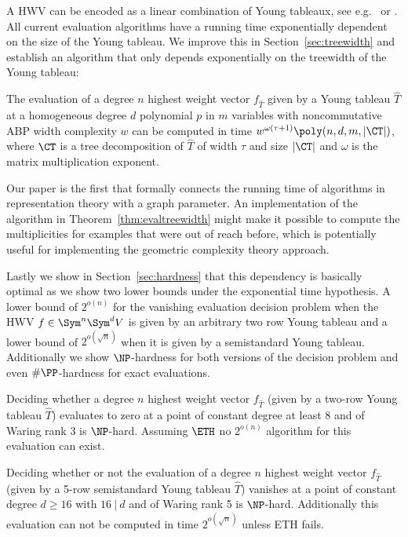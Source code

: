 A HWV can be encoded as a linear combination of Young tableaux, see e.g.~\cite[\S3.9]{Ott:13} or \cite[Sec.~4.3]{ike:12b}.
All current evaluation algorithms have a running time exponentially dependent on the size of the Young tableau.
We improve this in Section~\ref{sec:treewidth} and establish an algorithm that only depends exponentially on the treewidth of the Young tableau:
\begin{theorem*thm:evaltreewidth}
The evaluation of a degree $n$ highest weight vector $f_{\hat T}$ given by a Young tableau $\hat{T}$ 
at a homogeneous degree $d$ polynomial $p$ in $m$ variables with noncommutative ABP width complexity $w$ can be computed in time $w^{\omega(\tau+1)}\poly(n,d,m,|\CT|)$,
where $\CT$ is a tree decomposition of $\hat T$ of width $\tau$ and size $|\CT|$ and $\omega$ is the matrix multiplication exponent.
\end{theorem*thm:evaltreewidth}

Our paper is the first that formally connects the running time of algorithms in representation theory with a graph parameter. An implementation of the algorithm in Theorem~\ref{thm:evaltreewidth} might make it possible to compute the multiplicities for examples that were out of reach before, which is potentially useful for implementing the geometric complexity theory approach.

Lastly we show in Section~\ref{sec:hardness} that this dependency is basically optimal as we show two lower bounds under the exponential time hypothesis.
A lower bound of $2^{o(n)}$ for the vanishing evaluation decision problem when the HWV $f \in \Sym^n\Sym^d V$ is given by an arbitrary two row Young tableau and a lower bound of $2^{o(\sqrt{n})}$ when it is given by a semistandard Young tableau.
Additionally we show $\NP$-hardness for both versions of the decision problem and even $\#\PP$-hardness for exact evaluations.

\begin{theorem*thm:evaluationhardness}
    Deciding whether a degree $n$ highest weight vector $f_{\hat{T}}$ (given by a two-row Young tableau $\hat{T}$) evaluates to zero at a point of constant degree at least 8 and of Waring rank $3$ is $\NP$-hard.
    Assuming $\ETH$ no $2^{o(n)}$ algorithm for this evaluation can exist.
\end{theorem*thm:evaluationhardness}

\begin{theorem*thm:semistdhardness}
    Deciding whether or not the evaluation of a degree $n$ highest weight vector $f_{\hat{T}}$ (given by a 5-row semistandard Young tableau $\hat{T}$) vanishes at a point of constant degree $d \geq 16$ with $16~|~d$ and of Waring rank 5 is $\NP$-hard.
    Additionally this evaluation can not be computed in time $2^{o(\sqrt{n})}$ unless ETH fails.
\end{theorem*thm:semistdhardness}

